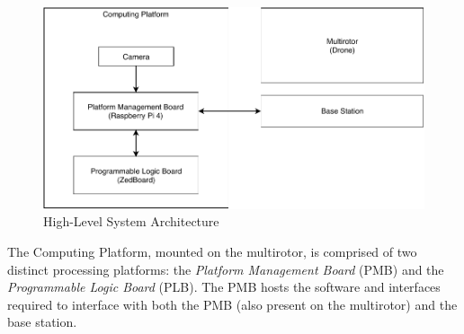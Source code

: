 \begin{figure}\label{hldiag}
\centering
\includegraphics[width=15cm]{img/highlevel.pdf}
\caption{High-Level System Architecture}
\end{figure}

The Computing Platform, mounted on the multirotor, is comprised of two distinct processing platforms: the \textit{Platform Management Board} (PMB) and the \textit{Programmable Logic Board} (PLB). The PMB hosts the software and interfaces required to interface with both the PMB (also present on the multirotor) and the base station.
